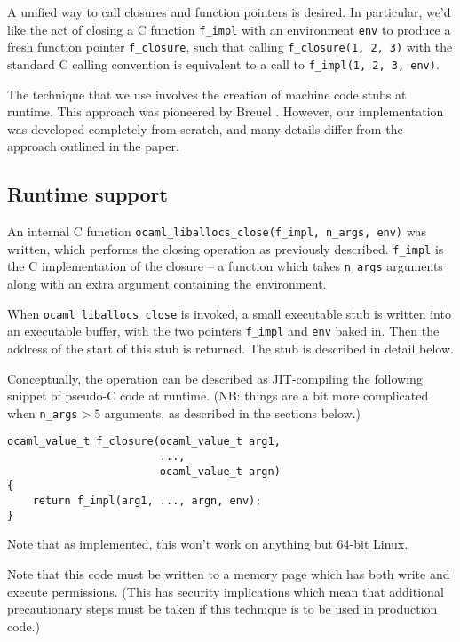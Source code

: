 \documentclass[12pt,a4paper,twoside,openright]{report}
\begin{document}
A unified way to call closures and function pointers is desired. In
particular, we'd like the act of closing a C function \lstinline!f_impl! with
an environment \lstinline!env! to produce a fresh function pointer
\lstinline!f_closure!, such that calling
\lstinline!f_closure(1, 2, 3)!
with the standard C calling convention is equivalent to a call to
\lstinline!f_impl(1, 2, 3, env)!.

The technique that we use involves the creation of machine code stubs at
runtime. This approach was pioneered by Breuel \cite{breuel88}. However, our implementation
was developed completely from scratch, and many details differ from the
approach outlined in the paper.

\subsection{Runtime support}\label{closures-runtime-support}

An internal C function \lstinline{ocaml_liballocs_close(f_impl, n_args, env)}
was written, which performs the closing operation as previously described.
\lstinline!f_impl! is the C implementation of the closure -- a function which
takes \lstinline!n_args! arguments along with an extra argument containing the environment.

When \lstinline!ocaml_liballocs_close! is
invoked, a small executable stub is written into an executable
buffer, with the two pointers \lstinline!f_impl! and \lstinline!env! baked in.
Then the address of the start of this stub is returned. The stub is described
in detail below.

Conceptually, the operation can be described as JIT-compiling the following
snippet of pseudo-C code at runtime. (NB: things are a bit more complicated
when \lstinline!n_args!${} > 5$ arguments, as described in the sections below.)

\begin{lstlisting}
ocaml_value_t f_closure(ocaml_value_t arg1,
                        ...,
                        ocaml_value_t argn)
{
    return f_impl(arg1, ..., argn, env);
}
\end{lstlisting}

Note that as implemented, this won't work on anything but 64-bit Linux.

Note that this code must be written to a memory page which has both write and
execute permissions. (This has security implications which mean that additional
precautionary steps must be taken if this technique is to be used in production
code.)
\end{document}
